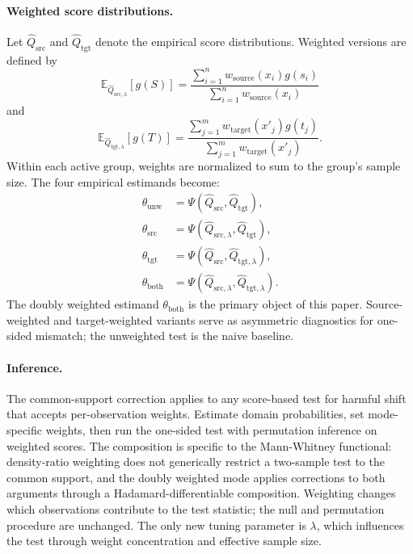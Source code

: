 \paragraph{Weighted score distributions.}
Let $\widehat{Q}_{\mathrm{src}}$ and $\widehat{Q}_{\mathrm{tgt}}$ denote the empirical score distributions. Weighted versions are defined by
\begin{equation}
  \mathbb{E}_{\widehat{Q}_{\mathrm{src},\lambda}}[g(S)] = \frac{\sum_{i=1}^n w_{\mathrm{source}}(x_i) g(s_i)}{\sum_{i=1}^n w_{\mathrm{source}}(x_i)}
\end{equation}
and
\begin{equation}
  \mathbb{E}_{\widehat{Q}_{\mathrm{tgt},\lambda}}[g(T)] = \frac{\sum_{j=1}^m w_{\mathrm{target}}(x'_j) g(t_j)}{\sum_{j=1}^m w_{\mathrm{target}}(x'_j)}.
\end{equation}
Within each active group, weights are normalized to sum to the group's sample size. The four empirical estimands become:
\begin{align}
  \theta_{\mathrm{unw}} &= \Psi(\widehat{Q}_{\mathrm{src}}, \widehat{Q}_{\mathrm{tgt}}), \\
  \theta_{\mathrm{src}} &= \Psi(\widehat{Q}_{\mathrm{src},\lambda}, \widehat{Q}_{\mathrm{tgt}}), \\
  \theta_{\mathrm{tgt}} &= \Psi(\widehat{Q}_{\mathrm{src}}, \widehat{Q}_{\mathrm{tgt},\lambda}), \\
  \theta_{\mathrm{both}} &= \Psi(\widehat{Q}_{\mathrm{src},\lambda}, \widehat{Q}_{\mathrm{tgt},\lambda}).
\end{align}
The doubly weighted estimand $\theta_{\mathrm{both}}$ is the primary object of this paper. Source-weighted and target-weighted variants serve as asymmetric diagnostics for one-sided mismatch; the unweighted test is the naive baseline.

\paragraph{Inference.}
The common-support correction applies to any score-based test for harmful shift that accepts per-observation weights. Estimate domain probabilities, set mode-specific weights, then run the one-sided test with permutation inference on weighted scores. The composition is specific to the Mann-Whitney functional: density-ratio weighting does not generically restrict a two-sample test to the common support, and the doubly weighted mode applies corrections to both arguments through a Hadamard-differentiable composition. Weighting changes which observations contribute to the test statistic; the null and permutation procedure are unchanged. The only new tuning parameter is $\lambda$, which influences the test through weight concentration and effective sample size.

